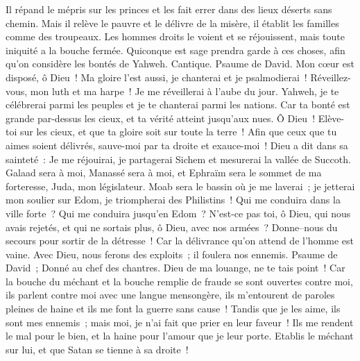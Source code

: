 \begin{multicols}{2}
Il répand le mépris sur les princes et les fait errer dans des lieux déserts sans chemin.
Mais il relève le pauvre et le délivre de la misère, il établit les familles comme des troupeaux.
Les hommes droits le voient et se réjouissent, mais toute iniquité a la bouche fermée.
Quiconque est sage prendra garde à ces choses, afin qu'on considère les bontés de Yahweh.
\VerseOne{}Cantique. Psaume de David. Mon cœur est disposé, ô Dieu~! Ma gloire l'est aussi, je chanterai et je psalmodierai~!
Réveillez-vous, mon luth et ma harpe~! Je me réveillerai à l'aube du jour.
Yahweh, je te célébrerai parmi les peuples et je te chanterai parmi les nations.
Car ta bonté est grande par-dessus les cieux, et ta vérité atteint jusqu'aux nues.
Ô Dieu~! Elève-toi sur les cieux, et que ta gloire soit sur toute la terre~!
Afin que ceux que tu aimes soient délivrés, sauve-moi par ta droite et exauce-moi~!
Dieu a dit dans sa sainteté~: Je me réjouirai, je partagerai Sichem et mesurerai la vallée de Succoth.
Galaad sera à moi, Manassé sera à moi, et Ephraïm sera le sommet de ma forteresse, Juda, mon législateur.
Moab sera le bassin où je me laverai~; je jetterai mon soulier sur Edom, je triompherai des Philistins~!
Qui me conduira dans la ville forte~? Qui me conduira jusqu'en Edom~?
N'est-ce pas toi, ô Dieu, qui nous avais rejetés, et qui ne sortais plus, ô Dieu, avec nos armées~?
Donne–nous du secours pour sortir de la détresse~! Car la délivrance qu'on attend de l'homme est vaine.
Avec Dieu, nous ferons des exploits~; il foulera nos ennemis.
\VerseOne{}Psaume de David~; Donné au chef des chantres. Dieu de ma louange, ne te tais point~!
Car la bouche du méchant et la bouche remplie de fraude se sont ouvertes contre moi, ils parlent contre moi avec une langue mensongère,
ils m'entourent de paroles pleines de haine et ils me font la guerre sans cause~!
Tandis que je les aime, ils sont mes ennemis~; mais moi, je n'ai fait que prier en leur faveur~!
Ils me rendent le mal pour le bien, et la haine pour l'amour que je leur porte.
Etablis le méchant sur lui, et que Satan se tienne à sa droite~!

\end{multicols}
